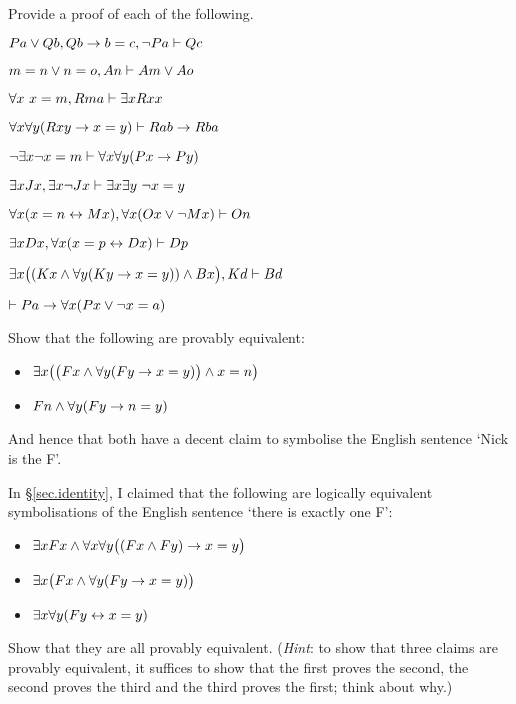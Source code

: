 \newpage
\practiceproblems
\problempart
\label{pr.identity}
Provide a proof of each of the following.
\begin{earg}
\item $Pa \vee Qb, Qb \rightarrow b=c, \neg Pa \vdash Qc$
\item $m=n \vee n=o, An \vdash Am \vee Ao$
\item $\forall x\ x=m, Rma\vdash \exists x Rxx$
\item $\forall x\forall y(Rxy \rightarrow x=y)\vdash Rab \rightarrow Rba$
\item $\neg \exists x\neg x = m \vdash \forall x\forall y (Px \rightarrow Py)$
\item $\exists x Jx, \exists x \neg Jx\vdash \exists x \exists y\ \neg x = y$
\item $\forall x(x=n \leftrightarrow Mx), \forall x(Ox \vee \neg Mx)\vdash On$
\item $\exists x Dx, \forall x(x=p \leftrightarrow Dx)\vdash Dp$
\item $\exists x\bigl( (Kx \wedge \forall y(Ky \rightarrow x=y)) \wedge Bx\bigr), Kd\vdash Bd$
\item $\vdash Pa \rightarrow \forall x(Px \vee \neg x = a)$
\end{earg}

\problempart
Show that the following are provably equivalent:
\begin{itemize}
\item $\exists x \bigl(\bigl(Fx \wedge \forall y (Fy \rightarrow x = y) \bigr) \wedge x = n\bigr)$
\item $Fn \wedge \forall y (Fy \rightarrow n= y)$
\end{itemize}
And hence that both have a decent claim to symbolise the English sentence `Nick is the F'.



\problempart
In §\ref{sec.identity}, I claimed that the following are logically equivalent symbolisations of the English sentence `there is exactly one F':
\begin{itemize}
\item $\exists x Fx \wedge \forall x \forall y \bigl( (Fx \wedge Fy) \rightarrow x = y\bigr)$
\item $\exists x \bigl(Fx \wedge \forall y (Fy \rightarrow x = y) \bigr)$
\item $\exists x \forall y (Fy \leftrightarrow x = y)$
\end{itemize}
Show that they are all provably equivalent. (\emph{Hint}: to show that three claims are provably equivalent, it suffices to show that the first proves the second, the second proves the third and the third proves the first; think about why.)



